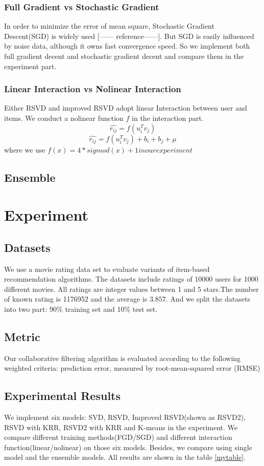 \documentclass[10pt,conference,compsocconf]{IEEEtran}
\begin{document}
\subsubsection{Full Gradient vs Stochastic Gradient}
In order to minimize the error of mean square, Stochastic Gradient Descent(SGD) is widely used [------ reference------]. But SGD is easily influenced by noise data, although it owns fast convergence speed. So we implement both full gradient decent and stochastic gradient decent and compare them in the experiment part.

\subsubsection{Linear Interaction vs Nolinear Interaction}
Either RSVD and improved RSVD adopt linear Interaction between user and items. We conduct a nolinear function $f$ in the interaction part.
$$ \hat{r_{ij}}=f(u_{i}^{T}v_{j})$$
$$ \hat{r_{ij}}=f(u_{i}^{T}v_{j}) + b_i + b_j  + \mu $$
where we use $f(x) = 4*sigmod(x)+1 in our experiment$
\subsection{Ensemble}



\section{Experiment}
\subsection{Datasets}

We use a movie rating data set to evaluate variants of item-based recommendation algorithms. The datasets include ratings of 10000 users for 1000 different movies. All ratings are integer values between 1 and 5 stars.The number of known rating is 1176952 and the average is $3.857$. And we split the datasets into two part: 90\% training set and 10\% test set.

\subsection{Metric}
Our collaborative filtering algorithm is evaluated according to the following weighted criteria:
prediction error, measured by root-mean-squared error (RMSE)

\subsection{Experimental Results}
We implement six models: SVD, RSVD, Improved RSVD(shown as RSVD2), RSVD with KRR, RSVD2 with KRR and K-means in the experiment. We compare different training methods(FGD/SGD) and different interaction
function(linear/nolinear) on those six models. Besides, we compare using single model and the ensemble models. All results are shown in the table \ref{mytable}.
\end{document}
